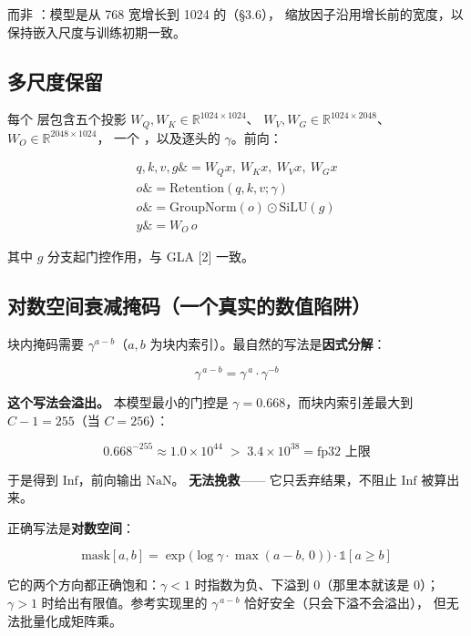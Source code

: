 \documentclass[11pt,openany]{ctexart}
\begin{document}
\begin{notebox}
 而非 ：模型是从 768 宽增长到 1024 的（§3.6）， 缩放因子沿用增长前的宽度，以保持嵌入尺度与训练初期一致。
\end{notebox}

\subsection{多尺度保留}

每个  层包含五个投影 $W_Q, W_K \in \mathbb{R}^{1024\times1024}$、 $W_V, W_G \in \mathbb{R}^{1024\times2048}$、$W_O \in \mathbb{R}^{2048\times1024}$， 一个 ，以及逐头的 $\gamma$。前向：

\[
\begin{aligned}
q,k,v,g \&= W_Q x,\ W_K x,\ W_V x,\ W_G x \\
o \&= \text{Retention}(q,k,v;\gamma) \\
o \&= \text{GroupNorm}(o) \odot \text{SiLU}(g) \\
y \&= W_O\, o
\end{aligned}
\]

其中 $g$ 分支起门控作用，与 GLA [2] 一致。

\subsection{对数空间衰减掩码（一个真实的数值陷阱）}

块内掩码需要 $\gamma^{a-b}$（$a,b$ 为块内索引）。最自然的写法是\textbf{因式分解}：

\[
\gamma^{\,a-b} = \gamma^{\,a} \cdot \gamma^{-b}
\]

\textbf{这个写法会溢出。} 本模型最小的门控是 $\gamma = 0.668$，而块内索引差最大到 $C-1 = 255$（当 $C=256$）：

\[
0.668^{-255} \approx 1.0 \times 10^{44} \;>\; 3.4\times10^{38} = \text{fp32 上限}
\]

于是得到 $\text{Inf}$，前向输出 $\text{NaN}$。\textbf{ 无法挽救}—— 它只丢弃结果，不阻止 $\text{Inf}$ 被算出来。

正确写法是\textbf{对数空间}：

\[
\text{mask}[a,b] = \exp\!\big(\log\gamma \cdot \max(a-b,\,0)\big)\cdot \mathbb{1}[a \ge b]
\]

它的两个方向都正确饱和：$\gamma<1$ 时指数为负、下溢到 0（那里本就该是 0）； $\gamma>1$ 时给出有限值。参考实现里的 $\gamma^{\,a-b}$ 恰好安全（只会下溢不会溢出）， 但无法批量化成矩阵乘。
\end{document}
